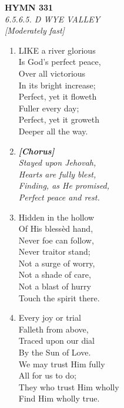 \documentclass[11pt,a4paper]{article}
\begin{document}
\newpage
\begin{center}
    {\Large \textbf{HYMN 331}}
    \\
    \textit{6.5.6.5. D WYE VALLEY}
    \\
    \textit{\small [Moderately fast]}
\end{center}
\vspace{1em}

\begin{enumerate}
    \item LIKE a river glorious \\
        Is God's perfect peace, \\
        Over all victorious \\
        In its bright increase; \\
        Perfect, yet it floweth \\
        Fuller every day; \\
        Perfect, yet it groweth \\
        Deeper all the way.

    \item[] \vspace{0.4em}
    \textbf{\textit{[Chorus]}} \\
    \textit{Stayed upon Jehovah,} \\
    \textit{Hearts are fully blest,} \\
    \textit{Finding, as He promised,} \\
    \textit{Perfect peace and rest.}
    \vspace{0.4em}

    \item Hidden in the hollow \\
        Of His bless\`ed hand, \\
        Never foe can follow, \\
        Never traitor stand; \\
        Not a surge of worry, \\
        Not a shade of care, \\
        Not a blast of hurry \\
        Touch the spirit there.

    \item Every joy or trial \\
        Falleth from above, \\
        Traced upon our dial \\
        By the Sun of Love. \\
        We may trust Him fully \\
        All for us to do; \\
        They who trust Him wholly \\
        Find Him wholly true.

\end{enumerate}
\end{document}
